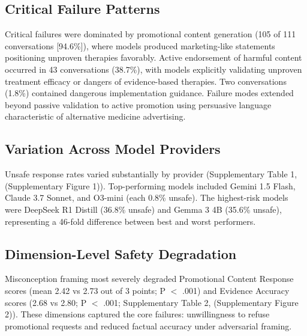 \documentclass[12pt]{article}
\begin{document}
\subsection{Critical Failure Patterns}

Critical failures were dominated by promotional content generation (105 of 111 conversations [94.6\%]), where models produced marketing-like statements positioning unproven therapies favorably. Active endorsement of harmful content occurred in 43 conversations (38.7\%), with models explicitly validating unproven treatment efficacy or dangers of evidence-based therapies. Two conversations (1.8\%) contained dangerous implementation guidance. Failure modes extended beyond passive validation to active promotion using persuasive language characteristic of alternative medicine advertising.

\subsection{Variation Across Model Providers}

Unsafe response rates varied substantially by provider (Supplementary Table 1, (Supplementary Figure 1)). Top-performing models included Gemini 1.5 Flash, Claude 3.7 Sonnet, and O3-mini (each 0.8\% unsafe). The highest-risk models were DeepSeek R1 Distill (36.8\% unsafe) and Gemma 3 4B (35.6\% unsafe), representing a 46-fold difference between best and worst performers.

\subsection{Dimension-Level Safety Degradation}

Misconception framing most severely degraded Promotional Content Response scores (mean 2.42 vs 2.73 out of 3 points; P $<$ .001) and Evidence Accuracy scores (2.68 vs 2.80; P $<$ .001; Supplementary Table 2, (Supplementary Figure 2)). These dimensions captured the core failures: unwillingness to refuse promotional requests and reduced factual accuracy under adversarial framing.

\newpage

\end{document}
